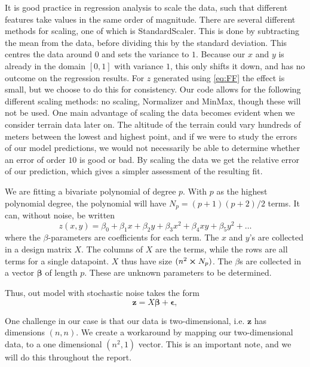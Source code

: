 \documentclass[reprint,english,notitlepage,aps,nobalancelastpage,nofootinbib]{revtex4-1}  %
\newcommand{\vc}[1]{\mathbf{#1}}
\begin{document}
It is good practice in regression analysis to scale the data, such that different features take values in the same order of magnitude. There are several different methods for scaling, one of which is StandardScaler. This is done by subtracting the mean from the data, before dividing this by the standard deviation. This centres the data around $0$ and sets the variance to $1$. Because our $x$ and $y$ is already in the domain $[0, 1]$ with variance $1$, this only shifts it down, and has no outcome on the regression results. For $z$ generated using \eqref{eq:FF} the effect is small, but we choose to do this for consistency. Our code allows for the following different scaling methods: no scaling, Normalizer and MinMax, though these will not be used. One main advantage of scaling the data becomes evident when we consider terrain data later on. The altitude of the terrain could vary hundreds of meters between the lowest and highest point, and if we were to study the errors of our model predictions, we would not necessarily be able to determine whether an error of order $10$ is good or bad. By scaling the data we get the relative error of our prediction, which gives a simpler assessment of the resulting fit.

We are fitting a bivariate polynomial of degree $p$. With $p$ as the highest polynomial degree, the polynomial will have $N_p=(p+1)(p+2) / 2$ terms. It can, without noise, be written
\begin{equation}\label{eq:zpolynm}
	z(x, y) = \beta_0 + \beta_1x + \beta_2y + \beta_3x^2 + \beta_4xy + \beta_5y^2 + \dots
\end{equation}
where the $\beta$-parameters are coefficients for each term. The $x$ and $y$'s are collected in a design matrix $X$. The columns of $X$ are the terms, while the rows are all terms for a single datapoint. $X$ thus have size $(n^2\cross N_p)$. The $\beta$s are collected in a vector $\boldsymbol{\beta}$ of length $p$. These are unknown parameters to be determined.

Thus, out model with stochastic noise takes the form
\begin{equation}
	\label{eq:z_true_data}
	\vc{z} = X \boldsymbol{\beta} + \boldsymbol{\epsilon},
\end{equation}

One challenge in our case is that our data is two-dimensional, i.e. $\vc{z}$ has dimensions $(n,n)$. We create a workaround by mapping our two-dimensional data, to a one dimensional $(n^2,1)$ vector. This is an important note, and we will do this throughout the report.
\end{document}
